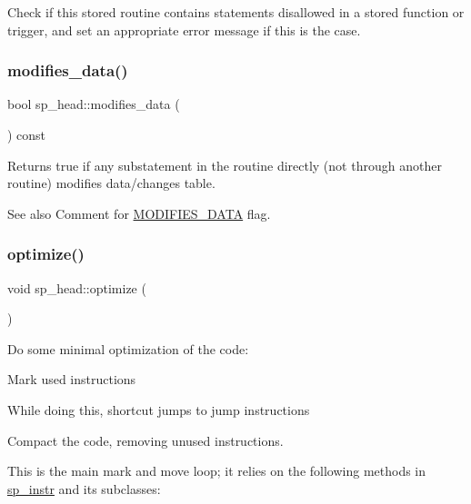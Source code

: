 Check if this stored routine contains statements disallowed in a stored function or trigger, and set an appropriate error message if this is the case. \mbox{\label{classsp__head_ad8b540cea8cf7bc09f6cdcba57b2c69e}} 
\subsubsection{\texorpdfstring{modifies\+\_\+data()}{modifies\_data()}}
{\footnotesize\ttfamily bool sp\+\_\+head\+::modifies\+\_\+data (\begin{DoxyParamCaption}{ }\end{DoxyParamCaption}) const\hspace{0.3cm}{\ttfamily [inline]}}

Returns true if any substatement in the routine directly (not through another routine) modifies data/changes table.

\begin{DoxySeeAlso}{See also}
Comment for \mbox{\hyperlink{classsp__head_a2c493addd6f76d1338bfda5f5a587371a2b0e1fb757a290996d14136d2f75a931}{M\+O\+D\+I\+F\+I\+E\+S\+\_\+\+D\+A\+TA}} flag. 
\end{DoxySeeAlso}
\mbox{\label{classsp__head_ad7f429d0eff3b51e9c5965d613f4bf11}} 
\subsubsection{\texorpdfstring{optimize()}{optimize()}}
{\footnotesize\ttfamily void sp\+\_\+head\+::optimize (\begin{DoxyParamCaption}{ }\end{DoxyParamCaption})}

Do some minimal optimization of the code\+:
\begin{DoxyEnumerate}
\item Mark used instructions
\item While doing this, shortcut jumps to jump instructions
\item Compact the code, removing unused instructions.
\end{DoxyEnumerate}

This is the main mark and move loop; it relies on the following methods in \mbox{\hyperlink{classsp__instr}{sp\+\_\+instr}} and its subclasses\+:


